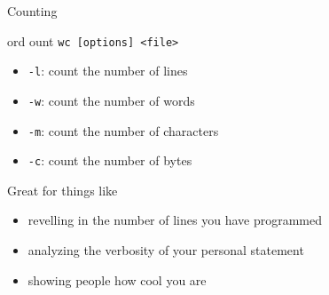 \begin{frame}[fragile]{Counting}
  \begin{block}{ord ount}
    \texttt{wc [options] <file>}
    \begin{itemize}
      \item \texttt{-l}: count the number of lines
      \item \texttt{-w}: count the number of words
      \item \texttt{-m}: count the number of characters
      \item \texttt{-c}: count the number of bytes
    \end{itemize}
  \end{block}
  Great for things like
  \begin{itemize}[<+- | alert@+>]
    \item revelling in the number of lines you have programmed
    \item analyzing the verbosity of your personal statement
    \item showing people how cool you are
  \end{itemize}
\end{frame}

